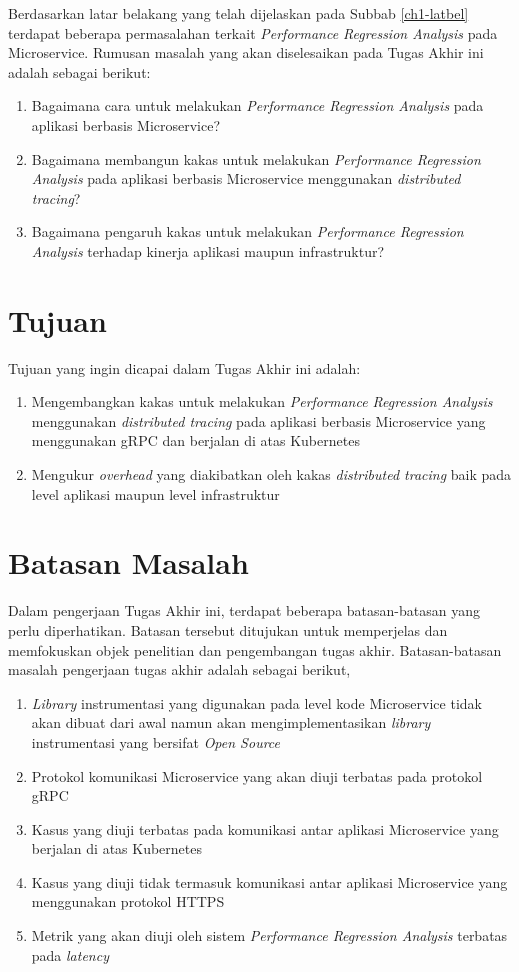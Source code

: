 Berdasarkan latar belakang yang telah dijelaskan pada Subbab \ref{ch1-latbel} terdapat beberapa permasalahan terkait \textit{Performance Regression Analysis} pada Microservice. Rumusan masalah yang akan diselesaikan pada Tugas Akhir ini adalah sebagai berikut:
\begin{enumerate}
	\item Bagaimana cara untuk melakukan \textit{Performance Regression Analysis} pada aplikasi berbasis Microservice?
	\item Bagaimana membangun kakas untuk melakukan \textit{Performance Regression Analysis} pada aplikasi berbasis Microservice menggunakan \textit{distributed tracing}?
	\item Bagaimana pengaruh kakas untuk melakukan \textit{Performance Regression Analysis} terhadap kinerja aplikasi maupun infrastruktur?
\end{enumerate}

\section{Tujuan}

Tujuan yang ingin dicapai dalam Tugas Akhir ini adalah:
\begin{enumerate}
	\item Mengembangkan kakas untuk melakukan \textit{Performance Regression Analysis} menggunakan \textit{distributed tracing}  pada aplikasi berbasis Microservice yang menggunakan gRPC dan berjalan di atas Kubernetes
	\item Mengukur \textit{overhead} yang diakibatkan oleh kakas \textit{distributed tracing} baik pada level aplikasi maupun level infrastruktur
\end{enumerate}


\section{Batasan Masalah}

Dalam pengerjaan Tugas Akhir ini, terdapat beberapa batasan-batasan yang perlu diperhatikan. Batasan tersebut ditujukan untuk memperjelas dan memfokuskan objek penelitian dan pengembangan tugas akhir. Batasan-batasan masalah pengerjaan tugas akhir adalah sebagai berikut,

\begin{enumerate}
	\item \textit{Library} instrumentasi yang digunakan pada level kode Microservice tidak akan dibuat dari awal namun akan mengimplementasikan \textit{library} instrumentasi yang bersifat \textit{Open Source}
	\item Protokol komunikasi Microservice yang akan diuji terbatas pada protokol gRPC
	\item Kasus yang diuji terbatas pada komunikasi antar aplikasi Microservice yang berjalan di atas Kubernetes
	\item Kasus yang diuji tidak termasuk komunikasi antar aplikasi Microservice yang menggunakan protokol HTTPS
	\item Metrik yang akan diuji oleh sistem \textit{Performance Regression Analysis} terbatas pada \textit{latency}
\end{enumerate}

